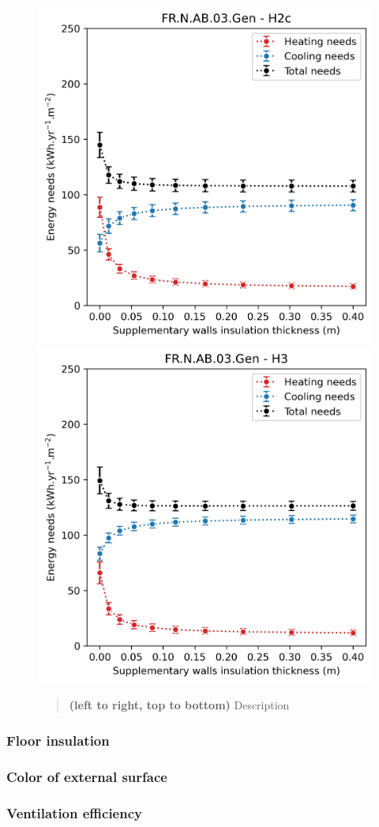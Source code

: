 \documentclass[11pt]{article}
\begin{document}
\begin{figure}[ht]
            \includegraphics[width=0.32\columnwidth]{figures/walls_FR.N.AB.03.Gen_H2c_conventionnel_th-bce_2020_2000-2020.png}
            \includegraphics[width=0.32\columnwidth]{figures/walls_FR.N.AB.03.Gen_H3_conventionnel_th-bce_2020_2000-2020.png}
            \begin{quote}
                \vspace{-2mm}
                \small\noindent
                \textbf{(left to right, top to bottom)} Description
              \end{quote}
        \end{figure}
        

        \subsubsection{Floor insulation} %
        \label{ssub:floor_insulation}
        

        \subsubsection{Color of external surface} %
        \label{ssub:color_of_external_surface}
        

        \subsubsection{Ventilation efficiency} %
        \label{ssub:ventilation_efficiency}
        
\end{document}
